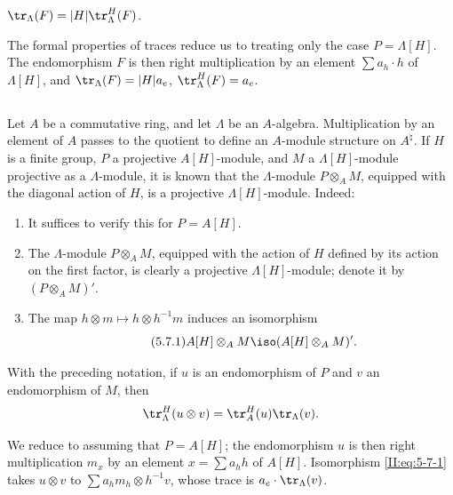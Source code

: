 \documentclass[oneside]{book}
\begin{document}
\begin{proposition_}\label{II:5-6}
$\tr_\Lambda(F) = |H|\tr_\Lambda^H(F)$.
\end{proposition_}

The formal properties of traces reduce us to treating only the case
$P=\Lambda[H]$. The endomorphism $F$ is then right multiplication by an
element $\sum a_h\cdot h$ of $\Lambda[H]$, and
$\tr_\Lambda(F) = |H| a_e$, $\tr_\Lambda^H(F) = a_e$.






\subsection{}\label{II:5-7}

Let $A$ be a commutative ring, and let $\Lambda$ be an $A$-algebra.
Multiplication by an element of $A$ passes to the quotient to define an
$A$-module structure on $A^\natural$. If $H$ is a finite group, $P$ a
projective $A[H]$-module, and $M$ a $\Lambda[H]$-module projective as a
$\Lambda$-module, it is known that the $\Lambda$-module $P\otimes_A M$,
equipped with the diagonal action of $H$, is a projective
$\Lambda[H]$-module. Indeed:
\begin{enumerate}[\indent a)]
  \item It suffices to verify this for $P=A[H]$.
  \item The $\Lambda$-module $P\otimes_A M$, equipped with the action of $H$
    defined by its action on the first factor, is clearly a projective
    $\Lambda[H]$-module; denote it by $(P\otimes_A M)'$.
  \item The map $h\otimes m\mapsto h\otimes h^{-1} m$ induces an isomorphism
    \begin{equation*}\tag{5.7.1}\label{II:eq:5-7-1}
      A[H]\otimes_A M \iso (A[H]\otimes_A M)' \text{.}
    \end{equation*}
\end{enumerate}






\begin{proposition_}\label{II:5-8}
With the preceding notation, if $u$ is an endomorphism of $P$ and $v$ an
endomorphism of $M$, then
\[
  \tr_\Lambda^H(u\otimes v) = \tr_A^H(u)\tr_\Lambda(v) \text{.}
\]
\end{proposition_}

We reduce to assuming that $P=A[H]$; the endomorphism $u$ is then right
multiplication $m_x$ by an element $x=\sum a_h h$ of $A[H]$. Isomorphism
\eqref{II:eq:5-7-1} takes $u\otimes v$ to
$\sum a_h m_h\otimes h^{-1} v$, whose trace is
$a_e\cdot\tr_\Lambda(v)$.
\end{document}
